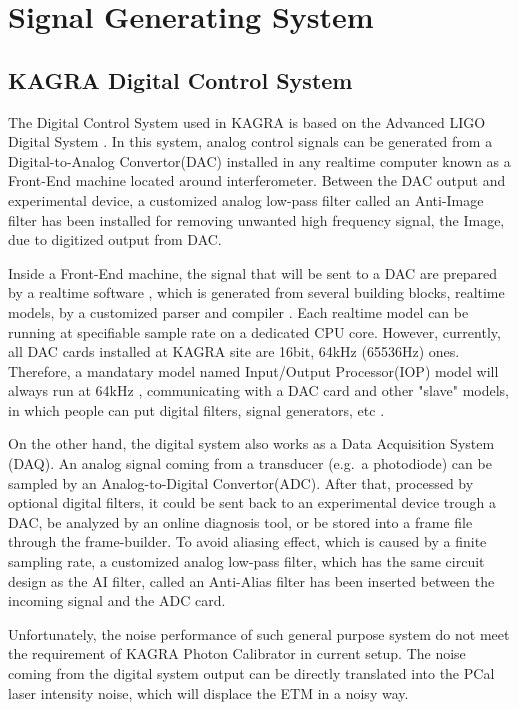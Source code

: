 \chapter{Signal Generating System}

\section{KAGRA Digital Control System}
The Digital Control System used in KAGRA is based on the Advanced LIGO Digital System \cite{dgs:overview}. In this system, analog control signals can be generated from a Digital-to-Analog Convertor(DAC) installed in any realtime computer known as a Front-End machine located around interferometer. Between the DAC output and experimental device, a customized analog low-pass filter called an Anti-Image filter \cite{dgs:aaai} has been installed for removing unwanted high frequency signal, the Image, due to digitized output from DAC. 

Inside a Front-End machine, the signal that will be sent to a DAC are prepared by a realtime software \cite{dgs:control.c}, which is generated from several building blocks, realtime models, by a customized parser and compiler \cite{dgs:rcg}. Each realtime model can be running at specifiable sample rate on a dedicated CPU core. However, currently, all DAC cards installed at KAGRA site are 16bit, 64kHz (65536Hz) ones. Therefore, a mandatary model named Input/Output Processor(IOP) model will always run at 64kHz \cite{dgs:control.c}, communicating with a DAC card and other "slave" models, in which people can put digital filters, signal generators, etc \cite{dgs:software_app}.



On the other hand, the digital system also works as a Data Acquisition System (DAQ). An analog signal coming from a transducer (e.g.~a photodiode) can be sampled by an Analog-to-Digital Convertor(ADC). After that, processed by optional digital filters, it could be sent back to an experimental device trough a DAC, be analyzed by an online diagnosis tool, or be stored into a frame file through the frame-builder. To avoid aliasing effect, which is caused by a finite sampling rate, a customized analog low-pass filter, which has the same circuit design as the AI filter, called an Anti-Alias filter \cite{dgs:aaai} has been inserted between the incoming signal and the ADC card.

Unfortunately, the noise performance of such general purpose system do not meet the requirement of KAGRA Photon Calibrator in current setup. The noise coming from the digital system output can be directly translated into the PCal laser intensity noise, which will displace the ETM in a noisy way.   

